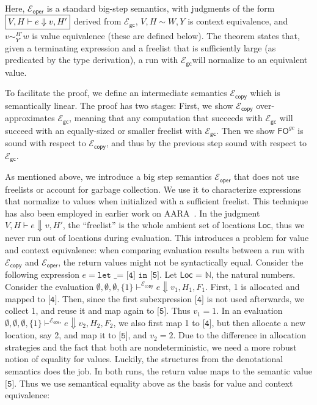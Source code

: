\documentclass{easychair}
\newcommand{\ms}[1]{\ensuremath{\mathsf{#1}}}
\newcommand{\veq}[4]{#3 \sim^{#1}_{#2} #4}
\newcommand{\fogc}{\ms{FO}^{gc}}
\newcommand{\gcSem}{\ensuremath{\mathcal{E}_{\ms{gc}}}}
\newcommand{\copySem}{\ensuremath{\mathcal{E}_{\ms{copy}}}}
\theoremstyle{definition}
\begin{document}
Here, $\mathcal{E}_{\ms{oper}}$ is a standard big-step semantics, with judgments of the form
$\fbox{$V,H \vdash e \Downarrow v,H'$}$
derived from \gcSem{}, $V,H \sim W,Y$ is context equivalence, and $\veq{H'}{Y'}{v}{w}$
is value equivalence (these are defined below). The theorem states that, given a terminating expression
and a freelist that is sufficiently large (as predicated by the type derivation), 
a run with \gcSem will normalize to an equivalent value.

To facilitate the proof, we define an intermediate semantics
\copySem{} which is semantically linear. The proof has two stages:
First, we show \copySem{} over-approximates \gcSem, meaning that any
computation that succeeds with \gcSem{} will succeed with an
equally-sized or smaller freelist with \gcSem{}. Then we show $\fogc$
is sound with respect to \copySem{}, and thus by the previous step sound with respect to
\gcSem{}.

As mentioned above, we introduce a big step semantics $\mathcal{E}_{\ms{oper}}$
that does not use freelists or account for garbage collection. We use
it to characterize expressions that normalize to values when initialized with a sufficient 
freelist.  This technique has also been employed in earlier work on AARA~\cite{Hofmann:2003:SPH:604131.604148}.
In the judgment $V,H \vdash e \Downarrow v,H'$, the ``freelist'' is the whole ambient set of
locations $\ms{Loc}$, thus we never run out of locations during evaluation. This introduces a
problem for value and context equivalence: when comparing evaluation results between a run
with \copySem{} and $\mathcal{E}_{\ms{oper}}$, the return values 
might not be syntactically equal. Consider the following expression
$e = \texttt{let \_ = [4] in [5]}$.
%
Let \ms{Loc} = $\mathbb{N}$, the natural numbers. Consider the evaluation
$\emptyset,\emptyset,\emptyset,\{1\} \vdash^{\copySem{}} e \Downarrow v_1,H_1,F_1$. 
First, 1 is allocated and mapped to $\texttt{[4]}$. 
Then, since the first subexpression $\texttt{[4]}$ is not used afterwards, we collect 1, and reuse it
and map again to $\texttt{[5]}$. Thus $v_1 = 1$.  In an evaluation
$\emptyset,\emptyset,\emptyset,\{1\} \vdash^{\mathcal{E}_{\ms{oper}}} e \Downarrow v_2,H_2,F_2$, 
we also first map 1 to $\texttt{[4]}$, but then 
allocate a new location, say 2, and map it to $\texttt{[5]}$, and $v_2 =  2$. Due to the 
difference in allocation strategies and the fact that both are nondeterministic, we need a more 
robust notion of equality for values. Luckily, the structures from the denotational semantics 
does the job. In both runs, the return value maps to the semantic value $\texttt{[5]}$.
Thus we use semantical equality above as the basis for value and context equivalence:
\end{document}
